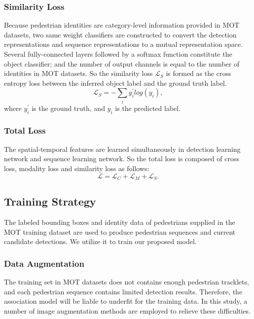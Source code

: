 \documentclass[times,twocolumn,final,authoryear]{elsarticle}
\begin{document}
\vspace{3pt}
\noindent
\subsubsection{Similarity Loss} 
Because pedestrian identities are category-level information provided in MOT datasets, two same weight classifiers are constructed to convert the detection representations and sequence representations to a mutual representation space.
Several fully-connected layers followed by a softmax function constitute the object classifier; 
and the number of output channels is equal to the number of identities in MOT datasets.
So the similarity loss $\mathcal{L}_{S}$ is formed as the cross entropy loss between the inferred object label and the ground truth label.
\begin{equation}\label{eq:cross_entropy}
\mathcal{L}_{S}=- \sum_{i} y_{i}^{'}log(y_i),
\end{equation}
where $y_{i}^{'}$ is the ground truth, and $y_{i}$ is the predicted label.

\vspace{5pt}
\noindent
\subsubsection{Total Loss}
The spatial-temporal features are learned simultaneously in detection learning network and sequence learning network.
So the total loss is composed of cross loss, modality loss and similarity loss as follows:
\begin{equation}\label{eq:loss}
\mathcal{L}=
\mathcal{L}_{C} + 
\mathcal{L}_{M} + \mathcal{L}_{S}.
\end{equation}


\subsection{Training Strategy}
\label{sec:training_strategy}
The labeled bounding boxes and identity data of pedestrians supplied in the MOT training dataset are used to produce pedestrian {sequences} and current candidate detections.
We utilize it to train our proposed model. 

\vspace{5pt}
\noindent
\subsubsection{Data Augmentation}
The training set in MOT datasets does not contains enough pedestrian tracklets, and each pedestrian sequence contains limited detection results. 
Therefore, the association model will be liable to underfit for the training data. 
In this study, a number of image augmentation methods are employed to relieve these difficulties.
\end{document}
